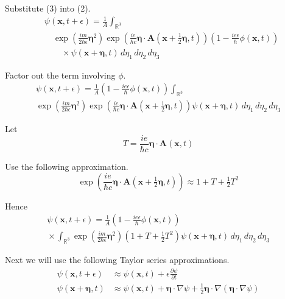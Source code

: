 \documentclass[12pt]{article}
\newcommand\INT{\int_{\mathbb R^3}}
\begin{document}
Substitute (3) into (2).
\begin{align*}
&\psi(\mathbf x,t+\epsilon)=
\frac{1}{A}\INT
\\
&\quad{}\exp\left(\frac{im}{2\hbar\epsilon}\boldsymbol\eta^2\right)
\exp\left(\frac{ie}{\hbar c}\boldsymbol\eta\cdot\mathbf A\left(\mathbf x+\tfrac{1}{2}\boldsymbol\eta,t\right)\right)
\left(1-\frac{ie\epsilon}{\hbar}\phi\left(\mathbf x,t\right)\right)
\\
&\quad\quad{}\times\psi(\mathbf x+\boldsymbol\eta,t)
\,d\eta_1\,d\eta_2\,d\eta_3
\end{align*}

Factor out the term involving $\phi$.
\begin{multline*}
\psi(\mathbf x,t+\epsilon)=
\frac{1}{A}\left(1-\frac{ie\epsilon}{\hbar}\phi\left(\mathbf x,t\right)\right)\INT
\\
\exp\left(\frac{im}{2\hbar\epsilon}\boldsymbol\eta^2\right)
\exp\left(\frac{ie}{\hbar c}\boldsymbol\eta\cdot\mathbf A\left(\mathbf x+\tfrac{1}{2}\boldsymbol\eta,t\right)\right)
\psi(\mathbf x+\boldsymbol\eta,t)
\,d\eta_1\,d\eta_2\,d\eta_3
\end{multline*}

Let
\begin{equation*}
T=\frac{ie}{\hbar c}\boldsymbol\eta\cdot\mathbf A(\mathbf x,t)
\end{equation*}

Use the following approximation.
\begin{equation*}
\exp\left(\frac{ie}{\hbar c}\boldsymbol\eta\cdot\mathbf A\left(\mathbf x+\tfrac{1}{2}\boldsymbol\eta,t\right)\right)
\approx
1+T+\tfrac{1}{2}T^2
\end{equation*}

Hence
\begin{multline*}
\psi(\mathbf x,t+\epsilon)=
\frac{1}{A}
\left(1-\frac{ie\epsilon}{\hbar}\phi\left(\mathbf x,t\right)\right)
\\
{}\times\INT\exp\left(\frac{im}{2\hbar\epsilon}\boldsymbol\eta^2\right)
\left(1+T+\tfrac{1}{2}T^2\right)
\psi(\mathbf x+\boldsymbol\eta,t)
\,d\eta_1\,d\eta_2\,d\eta_3
\tag{4}
\end{multline*}

Next we will use the following Taylor series approximations.
\begin{equation*}
\begin{aligned}
\psi(\mathbf x,t+\epsilon)&\approx\psi(\mathbf x,t)+\epsilon\frac{\partial\psi}{\partial t}
\\
\psi(\mathbf x+\boldsymbol\eta,t)&\approx\psi(\mathbf x,t)+\boldsymbol\eta\cdot\nabla\psi
+\tfrac{1}{2}\boldsymbol\eta\cdot\nabla(\boldsymbol\eta\cdot\nabla\psi)
\end{aligned}
\tag{5}
\end{equation*}
\end{document}
